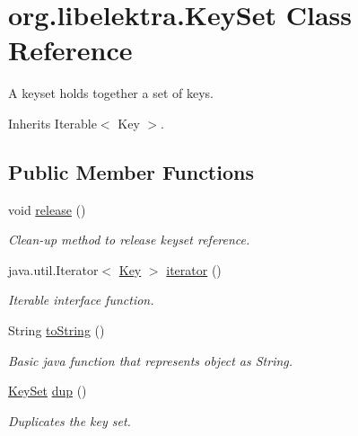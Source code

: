 \hypertarget{classorg_1_1libelektra_1_1KeySet}{}\section{org.\+libelektra.\+Key\+Set Class Reference}
\label{classorg_1_1libelektra_1_1KeySet}


A keyset holds together a set of keys.  




Inherits Iterable$<$ Key $>$.

\subsection*{Public Member Functions}
\begin{DoxyCompactItemize}
\item 
\mbox{\label{classorg_1_1libelektra_1_1KeySet_aa3851e13c627e32f02275636806e30cc}} 
void \hyperlink{classorg_1_1libelektra_1_1KeySet_aa3851e13c627e32f02275636806e30cc}{release} ()
\begin{DoxyCompactList}\small\item\em Clean-\/up method to release keyset reference. \end{DoxyCompactList}\item 
java.\+util.\+Iterator$<$ \hyperlink{classorg_1_1libelektra_1_1Key}{Key} $>$ \hyperlink{classorg_1_1libelektra_1_1KeySet_ac7ef2aa30918b5790cbba04b4fe70073}{iterator} ()
\begin{DoxyCompactList}\small\item\em Iterable interface function. \end{DoxyCompactList}\item 
String \hyperlink{classorg_1_1libelektra_1_1KeySet_a9c1e2918acce8c7cda5be406989c87af}{to\+String} ()
\begin{DoxyCompactList}\small\item\em Basic java function that represents object as String. \end{DoxyCompactList}\item 
\hyperlink{classorg_1_1libelektra_1_1KeySet}{Key\+Set} \hyperlink{classorg_1_1libelektra_1_1KeySet_af3571c68cd55983c45666cf9f75143a1}{dup} ()
\begin{DoxyCompactList}\small\item\em Duplicates the key set. \end{DoxyCompactList}\item 

\end{DoxyCompactItemize}
